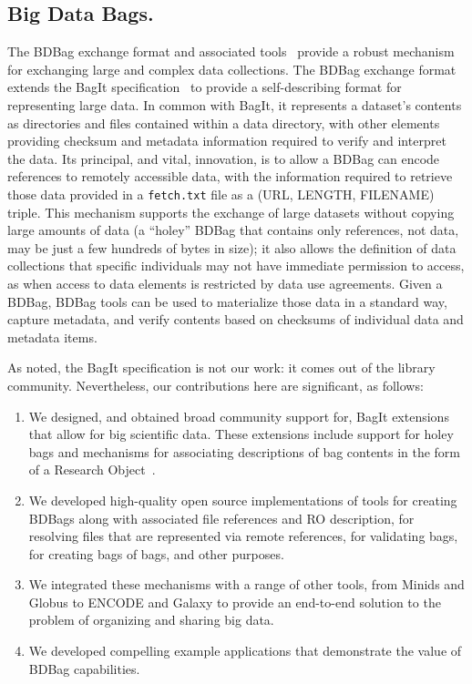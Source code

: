 \documentclass[11pt]{article}
\begin{document}
\subsection{Big Data Bags.}

The BDBag exchange format and associated tools~\cite{chard16} provide a robust mechanism for exchanging large and complex data collections. 
The BDBag exchange format extends the BagIt specification~\cite{Kunze2015} to provide a self-describing format for representing large data. 
In common with BagIt, it represents a dataset's contents as directories and files contained within a data directory,
with other elements providing checksum and metadata information required to verify and interpret the data. 
Its principal, and vital, innovation, is to allow a BDBag can encode references to remotely accessible data, with the information required to retrieve those data provided in a \texttt{fetch.txt} file as a (URL, LENGTH, FILENAME) triple. 
This mechanism supports the exchange of large datasets without copying large amounts of data (a ``holey'' BDBag that contains only references, not data, may be just a few hundreds of bytes in size); it also allows the definition of data collections that specific individuals may not have immediate permission to access, as when access to data elements is restricted by data use agreements.
Given a BDBag, BDBag tools can be used to materialize those data in a standard way, capture metadata, and verify contents based on checksums of individual data and metadata items.

As noted, the BagIt specification is not our work: it comes out of the library community.
Nevertheless, our contributions here are significant, as follows:
\begin{enumerate}
\item
We designed, and obtained broad community support for, BagIt extensions that allow for big scientific data.
These extensions include support for
holey bags and mechanisms for associating descriptions of bag contents in the form of a Research Object~\cite{bechhofer2013linked}.

\item
We developed high-quality open source implementations of tools for creating BDBags along with associated
file references and RO description, for resolving files that are represented via remote references, for validating
bags, for creating bags of bags, and other purposes.

\item
We integrated these mechanisms with a range of other tools, 
from Minids and Globus to ENCODE and Galaxy 
to provide an end-to-end solution to the problem of organizing and sharing big data. 

\item
We developed compelling example applications that demonstrate the value of BDBag capabilities.

\end{enumerate}
\end{document}
